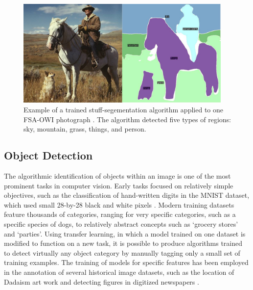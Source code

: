 \documentclass[10pt, a4paper]{article}
\begin{document}
\begin{figure}[!ht]
\begin{center}
\includegraphics[width=0.95\textwidth]{../figures/segmentation_examples_small.jpg}
\caption{Example of a trained stuff-segementation algorithm applied to
one FSA-OWI photograph \protect\cite{wu2019detectron2}. The algorithm
detected five types of regions: sky, mountain, grass, things, and person.}
\label{tab:segmentation}
\end{center}
\end{figure}

\subsection{Object Detection}

The algorithmic identification of objects within an image is one of the most
prominent tasks in computer vision. Early tasks focused on
relatively simple objectives, such as the classification of hand-written
digits in the MNIST dataset, which used small 28-by-28 black and white pixels
\cite{platt1999using}. Modern training datasets feature thousands of categories,
ranging for very specific categories, such as a specific species of dogs, to
relatively abstract concepts such as `grocery stores' and `parties'. Using
transfer learning, in which a model trained on one dataset is modified to
function on a new task, it is possible to produce algorithms trained to detect
virtually any object category by manually tagging only a small set of training
examples. The training of models for specific features has been employed in
the annotation of several historical image datasets, such as the location of
Dadaism art work \cite{thompson2017computational} and detecting figures in
digitized newspapers \cite{wevers2019visual}.
\end{document}
